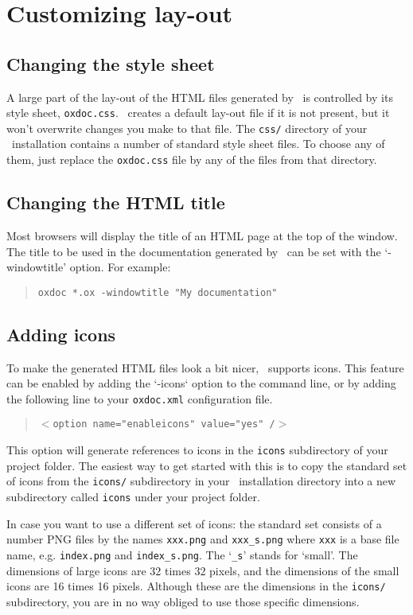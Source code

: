 \chapter{Customizing lay-out}

\section{Changing the style sheet}
A large part of the lay-out of the HTML files generated by \oxdoc~is controlled by its
style sheet, {\tt oxdoc.css}. \oxdoc~creates a default
lay-out file if it is not present, but it won't overwrite changes you make
to that file. The {\tt css/} directory of your \oxdoc~installation contains a number of 
standard style sheet files. To choose any of them, just replace the {\tt oxdoc.css} file
by any of the files from that directory. 

\section{Changing the HTML title}
Most browsers will display the title of an HTML page at the top of the window. The title to be used
in the documentation generated by \oxdoc~can be set with the `-windowtitle' option. For example:
\begin{quote}
\tt oxdoc *.ox -windowtitle "My documentation"
\end{quote}

\section{Adding icons}
To make the generated HTML files look a bit nicer, \oxdoc~supports icons. This feature can
be enabled by adding the `-icons` option to the command line, or by adding the following line
to your {\tt oxdoc.xml} configuration file.
\begin{quote}
\tt $<$option name="enableicons" value="yes" /$>$
\end{quote}
This option will generate references to icons in the {\tt icons} subdirectory of your
project folder. The easiest way to get started with this is to copy the standard set of icons 
from the {\tt icons/} subdirectory in your \oxdoc~installation
directory into a new subdirectory called {\tt icons} under your project folder. 

In case you want to use a different set of icons: 
the standard set consists of a number PNG files by the names {\tt xxx.png} and {\tt xxx\_s.png} where
{\tt xxx} is a base file name, e.g. {\tt index.png} and {\tt index\_s.png}. The `{\tt \_s}' stands for
`small'. The dimensions of large icons are 32 times 32 pixels, and the dimensions of the small icons
are 16 times 16 pixels. Although these are the dimensions in the {\tt icons/} subdirectory,
you are in no way obliged to use those specific dimensions. 

